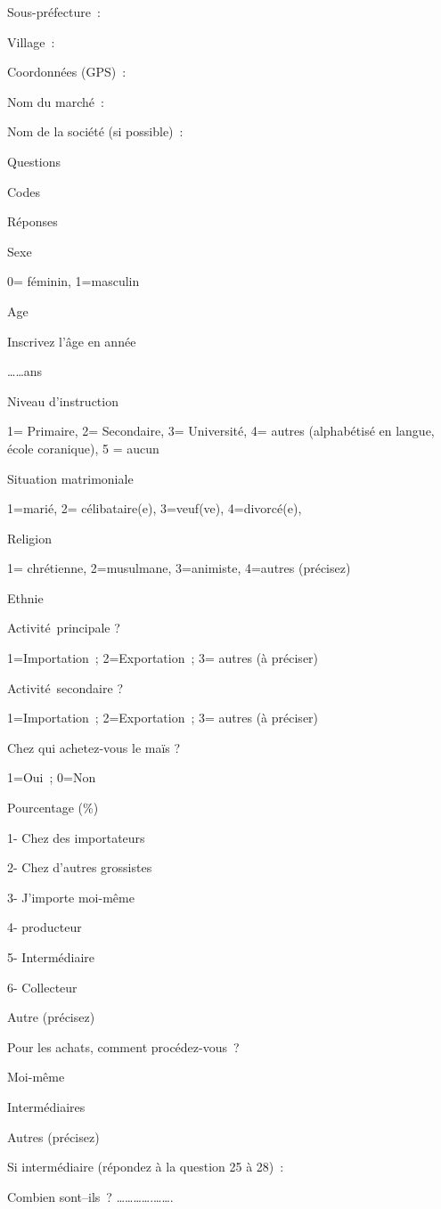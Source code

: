 \documentclass[12pt,oneside]{report}
\begin{document}
Sous-préfecture :

Village :

Coordonnées (GPS) :

Nom du marché :

Nom de la société (si possible) :

Questions

Codes

Réponses

Sexe

0= féminin, 1=masculin

Age

Inscrivez l’âge en année

……ans

Niveau d’instruction

1= Primaire, 2= Secondaire, 3= Université, 4= autres (alphabétisé en langue, école coranique), 5 = aucun

Situation matrimoniale

1=marié, 2= célibataire(e), 3=veuf(ve), 4=divorcé(e),

Religion

1= chrétienne, 2=musulmane, 3=animiste, 4=autres (précisez)

Ethnie

Activité principale ?

1=Importation ; 2=Exportation ; 3= autres (à préciser)

Activité secondaire ?

1=Importation ; 2=Exportation ; 3= autres (à préciser)

Chez qui achetez-vous le maïs ?

1=Oui ; 0=Non

Pourcentage (\%)

1- Chez des importateurs

2- Chez d’autres grossistes

3- J’importe moi-même

4- producteur

5- Intermédiaire

6- Collecteur

Autre (précisez)

Pour les achats, comment procédez-vous ?

Moi-même

Intermédiaires

Autres (précisez)

Si intermédiaire (répondez à la question 25 à 28) :

Combien sont–ils ? ………….…….
\end{document}
